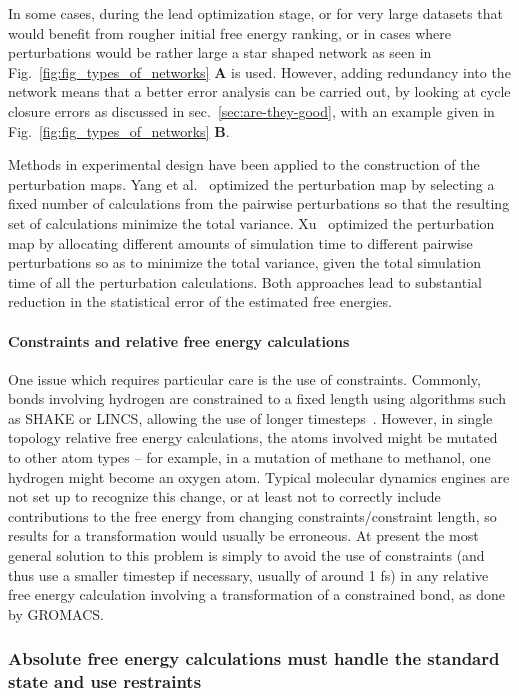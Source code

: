 \documentclass[9pt,bestpractices]{livecoms}
\begin{document}
In some cases, during the lead optimization stage, or for very large datasets that would benefit from rougher initial free energy ranking, or in cases where perturbations would be rather large a star shaped network as seen in Fig.~\ref{fig:fig_types_of_networks} \textbf{A} is used. However, adding redundancy into the network means that a better error analysis can be carried out, by looking at cycle closure errors as discussed in sec.~\ref{sec:are-they-good}, with an example given in Fig.~\ref{fig:fig_types_of_networks} \textbf{B}.


Methods in experimental design have been applied to the construction of the perturbation maps. Yang et al.~\cite{yang2020optimal} optimized the perturbation map by selecting a fixed number of calculations from the pairwise perturbations so that the resulting set of calculations minimize the total variance. Xu~\cite{xu2019optimal} optimized the perturbation map by allocating different amounts of simulation time to different pairwise perturbations so as to minimize the total variance, given the total simulation time of all the perturbation calculations. Both approaches lead to substantial reduction in the statistical error of the estimated free energies.  


\paragraph{Constraints and relative free energy calculations}
One issue which requires particular care is the use of constraints.
Commonly, bonds involving hydrogen are constrained to a fixed length using algorithms such as SHAKE or LINCS, allowing the use of longer timesteps~\cite{krautler2001fast}.
However, in single topology relative free energy calculations, the atoms involved might be mutated to other atom types -- for example, in a mutation of methane to methanol, one hydrogen might become an oxygen atom.
Typical molecular dynamics engines are not set up to recognize this change, or at least not to correctly include contributions to the free energy from changing constraints/constraint length, so results for a transformation would usually be erroneous.
At present the most general solution to this problem is simply to avoid the use of constraints (and thus use a smaller timestep if necessary, usually of around 1 fs) in any relative free energy calculation involving a transformation of a constrained bond, as done by GROMACS. 


\subsubsection{Absolute free energy calculations must handle the standard state and use restraints}
\label{sec:standardstate-restraints}
\end{document}
